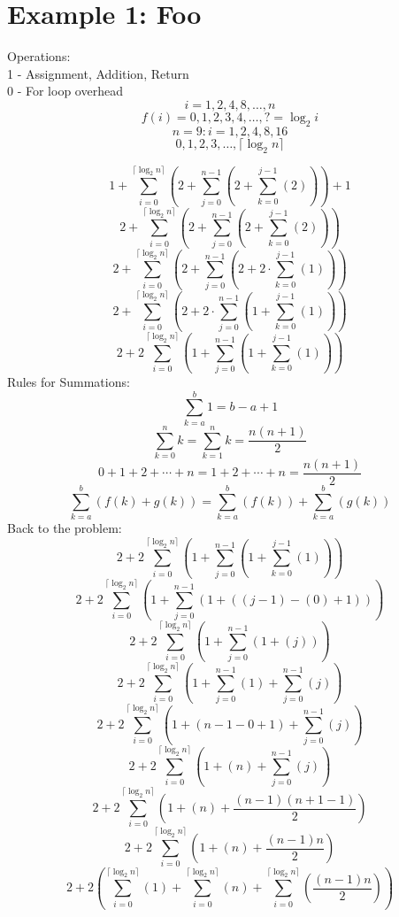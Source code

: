 \documentclass{article}
\title{}
\author{}
\begin{document}
\maketitle

\tableofcontents

\section{Example 1: Foo}
Operations:\\
1 - Assignment, Addition, Return\\
0 - For loop overhead\\
$$i=1,2,4,8,\ldots,n$$
$$f(i)=0,1,2,3,4,\ldots,?=\log_2i$$
$$n=9:i=1,2,4,8,16$$
$$0,1,2,3,\ldots,\lceil\log_2n\rceil$$

$$1+\sum_{i=0}^{\lceil\log_2n\rceil}\left(2+\sum_{j=0}^{n-1}\left(2+\sum_{k=0}^{j-1}\left(2\right)\right)\right)+1$$
$$2+\sum_{i=0}^{\lceil\log_2n\rceil}\left(2+\sum_{j=0}^{n-1}\left(2+\sum_{k=0}^{j-1}\left(2\right)\right)\right)$$
$$2+\sum_{i=0}^{\lceil\log_2n\rceil}\left(2+\sum_{j=0}^{n-1}\left(2+2\cdot\sum_{k=0}^{j-1}\left(1\right)\right)\right)$$
$$2+\sum_{i=0}^{\lceil\log_2n\rceil}\left(2+2\cdot\sum_{j=0}^{n-1}\left(1+\sum_{k=0}^{j-1}\left(1\right)\right)\right)$$
$$2+2\sum_{i=0}^{\lceil\log_2n\rceil}\left(1+\sum_{j=0}^{n-1}\left(1+\sum_{k=0}^{j-1}\left(1\right)\right)\right)$$
Rules for Summations:
$$\sum_{k=a}^{b}1=b-a+1$$
$$\sum_{k=0}^{n}k=\sum_{k=1}^{n}k=\frac{n\left(n+1\right)}{2}$$
$$0+1+2+\cdots+n=1+2+\cdots+n=\frac{n\left(n+1\right)}{2}$$
$$\sum_{k=a}^{b}\left(f(k)+g(k)\right)=\sum_{k=a}^{b}\left(f(k)\right)+\sum_{k=a}^{b}\left(g(k)\right)$$
Back to the problem:
$$2+2\sum_{i=0}^{\lceil\log_2n\rceil}\left(1+\sum_{j=0}^{n-1}\left(1+\sum_{k=0}^{j-1}\left(1\right)\right)\right)$$
$$2+2\sum_{i=0}^{\lceil\log_2n\rceil}\left(1+\sum_{j=0}^{n-1}\left(1+\left(\left(j-1\right)-\left(0\right)+1\right)\right)\right)$$
$$2+2\sum_{i=0}^{\lceil\log_2n\rceil}\left(1+\sum_{j=0}^{n-1}\left(1+\left(j\right)\right)\right)$$
$$2+2\sum_{i=0}^{\lceil\log_2n\rceil}\left(1+\sum_{j=0}^{n-1}\left(1\right)+\sum_{j=0}^{n-1}\left(j\right)\right)$$
$$2+2\sum_{i=0}^{\lceil\log_2n\rceil}\left(1+\left(n-1-0+1\right)+\sum_{j=0}^{n-1}\left(j\right)\right)$$
$$2+2\sum_{i=0}^{\lceil\log_2n\rceil}\left(1+\left(n\right)+\sum_{j=0}^{n-1}\left(j\right)\right)$$
$$2+2\sum_{i=0}^{\lceil\log_2n\rceil}\left(1+\left(n\right)+\frac{\left(n-1\right)\left(n+1-1\right)}{2}\right)$$
$$2+2\sum_{i=0}^{\lceil\log_2n\rceil}\left(1+\left(n\right)+\frac{\left(n-1\right)n}{2}\right)$$
$$2+2\left(\sum_{i=0}^{\lceil\log_2n\rceil}\left(1\right)+\sum_{i=0}^{\lceil\log_2n\rceil}\left(n\right)+\sum_{i=0}^{\lceil\log_2n\rceil}\left(\frac{\left(n-1\right)n}{2}\right)\right)$$
\end{document}
